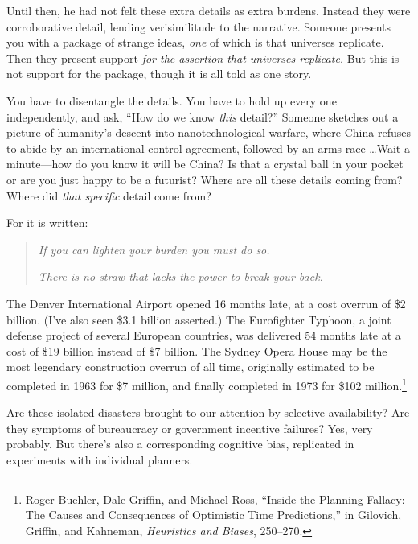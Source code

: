 {
 Until then, he had not felt these extra details as extra burdens.
Instead they were corroborative detail, lending verisimilitude to the
narrative. Someone presents you with a package of strange ideas,
\textit{one} of which is that universes replicate. Then they present
support \textit{for the assertion that universes replicate.} But this
is not support for the package, though it is all told as one story.}

{
 You have to disentangle the details. You have to hold up every one
independently, and ask, ``How do we know \textit{this}
detail?'' Someone sketches out a picture of
humanity's descent into nanotechnological warfare,
where China refuses to abide by an international control agreement,
followed by an arms race \ldots Wait a minute---how do you know it will
be China? Is that a crystal ball in your pocket or are you just happy
to be a futurist? Where are all these details coming from? Where did
\textit{that specific} detail come from?}

{
 For it is written:}

\begin{quote}
{
 \textit{If you can lighten your burden you must do so.}}

{
 \textit{There is no straw that lacks the power to break your
   back.}}
\end{quote}

\myendsectiontext


\bigskip


{
 The Denver International Airport opened 16 months late, at a cost
overrun of \$2 billion. (I've also seen \$3.1 billion
asserted.) The Eurofighter Typhoon, a joint defense project of several
European countries, was delivered 54 months late at a cost of \$19
billion instead of \$7 billion. The Sydney Opera House may be the most
legendary construction overrun of all time, originally estimated to be
completed in 1963 for \$7 million, and finally completed in 1973 for
\$102 million.\footnote{Roger Buehler, Dale Griffin, and Michael Ross,
``Inside the Planning Fallacy: The Causes and
Consequences of Optimistic Time Predictions,'' in
Gilovich, Griffin, and Kahneman, \textit{Heuristics and Biases},
250--270.} }

{
 Are these isolated disasters brought to our attention by selective
availability? Are they symptoms of bureaucracy or government incentive
failures? Yes, very probably. But there's also a
corresponding cognitive bias, replicated in experiments with individual
planners.}

